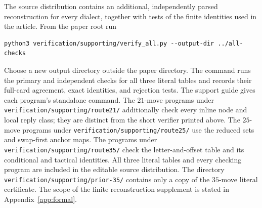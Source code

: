 The source distribution contains an additional, independently parsed
reconstruction for every dialect, together with tests of the finite
identities used in the article. From the paper root run
\begin{lstlisting}[basicstyle=\ttfamily\small]
python3 verification/supporting/verify_all.py --output-dir ../all-checks
\end{lstlisting}
Choose a new output directory outside the paper directory. The command
runs the primary and independent checks for all three literal tables
and records their full-card agreement, exact identities, and rejection
tests. The support guide gives each program's standalone command.
The $21$-move programs under \texttt{verification/supporting/route21/} additionally
check every inline node and local reply class; they are distinct from
the short verifier printed above. The $25$-move programs under
\texttt{verification/supporting/route25/} use the reduced sets and swap-first anchor
maps. The programs under \texttt{verification/supporting/route35/} check the
letter-and-offset table and its conditional and tactical identities.
All three literal tables and every checking program are included in
the editable source distribution. The directory
\texttt{verification/supporting/prior-35/} contains only a copy of the $35$-move
literal certificate. The scope of the finite reconstruction supplement
is stated in Appendix~\ref{app:formal}.
